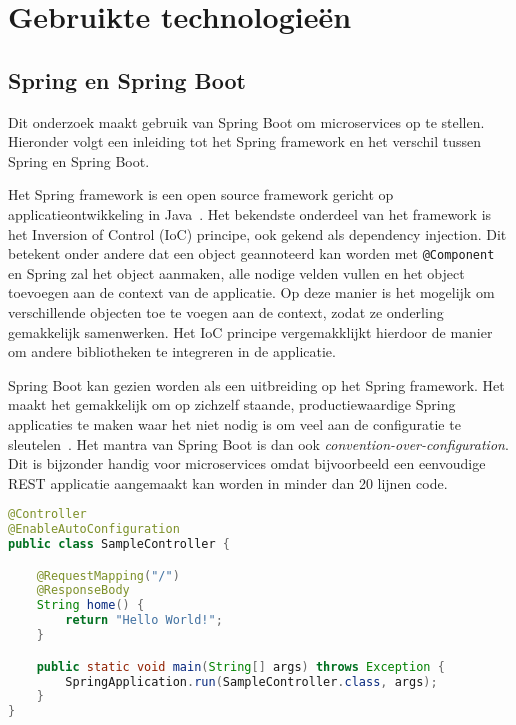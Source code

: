 
\chapter{Gebruikte technologieën}
\label{ch:technologie}



\section{Spring en Spring Boot}
\label{sec:spring-boot}

Dit onderzoek maakt gebruik van Spring Boot om microservices op te stellen. Hieronder volgt een inleiding tot het Spring framework en het verschil tussen Spring en Spring Boot.

Het Spring framework is een open source framework gericht op applicatieontwikkeling in Java~\autocite{Spring2014}. Het bekendste onderdeel van het framework is het Inversion of Control (IoC) principe, ook gekend als dependency injection. Dit betekent onder andere dat een object geannoteerd kan worden met \texttt{@Component} en Spring zal het object aanmaken, alle nodige velden vullen en het object toevoegen aan de context van de applicatie. Op deze manier is het mogelijk om verschillende objecten toe te voegen aan de context, zodat ze onderling gemakkelijk samenwerken. Het IoC principe vergemakklijkt hierdoor de manier om andere bibliotheken te integreren in de applicatie.

Spring Boot kan gezien worden als een uitbreiding op het Spring framework. Het maakt het gemakkelijk om op zichzelf staande, productiewaardige Spring applicaties te maken waar het niet nodig is om veel aan de configuratie te sleutelen~\autocite{SpringBoot2015}. Het mantra van Spring Boot is dan ook \textit{convention-over-configuration}. Dit is bijzonder handig voor microservices omdat bijvoorbeeld een eenvoudige REST applicatie aangemaakt kan worden in minder dan 20 lijnen code.

\begin{lstlisting}[language=Java, basicstyle=\ttfamily\small, caption=eenvoudige Spring Boot REST app]
@Controller
@EnableAutoConfiguration
public class SampleController {

    @RequestMapping("/")
    @ResponseBody
    String home() {
        return "Hello World!";
    }

    public static void main(String[] args) throws Exception {
        SpringApplication.run(SampleController.class, args);
    }
}
\end{lstlisting}

